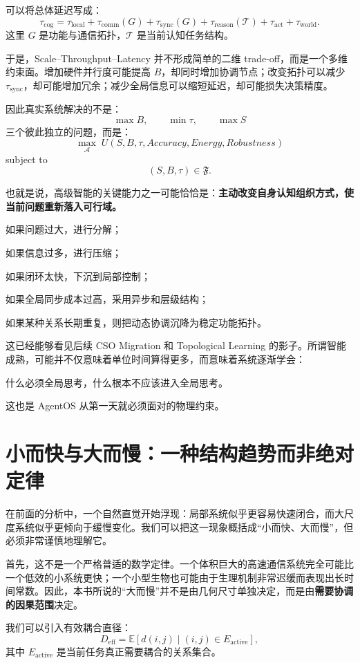 可以将总体延迟写成：
\[
\tau_{\mathrm{cog}}
=
\tau_{\mathrm{local}}
+
\tau_{\mathrm{comm}}(G)
+
\tau_{\mathrm{sync}}(G)
+
\tau_{\mathrm{reason}}(\mathcal T)
+
\tau_{\mathrm{act}}
+
\tau_{\mathrm{world}}.
\]
这里 $G$ 是功能与通信拓扑，$\mathcal T$ 是当前认知任务结构。

于是，Scale--Throughput--Latency 并不形成简单的二维 trade-off，而是一个多维约束面。增加硬件并行度可能提高 $B$，却同时增加协调节点；改变拓扑可以减少 $\tau_{\mathrm{sync}}$，却可能增加冗余；减少全局信息可以缩短延迟，却可能损失决策精度。

因此真实系统解决的不是：
\[
\max B,
\qquad
\min \tau,
\qquad
\max S
\]
三个彼此独立的问题，而是：
\[
\boxed{
\max_{\mathcal A}
\;
U(
S,
B,
\tau,
Accuracy,
Energy,
Robustness
)
}
\]
subject to
\[
(S,B,\tau)\in\mathfrak F.
\]

也就是说，高级智能的关键能力之一可能恰恰是：\textbf{主动改变自身认知组织方式，使当前问题重新落入可行域。}

如果问题过大，进行分解；

如果信息过多，进行压缩；

如果闭环太快，下沉到局部控制；

如果全局同步成本过高，采用异步和层级结构；

如果某种关系长期重复，则把动态协调沉降为稳定功能拓扑。

这已经能够看见后续 CSO Migration 和 Topological Learning 的影子。所谓智能成熟，可能并不仅意味着单位时间算得更多，而意味着系统逐渐学会：

\begin{statementbox}
什么必须全局思考，什么根本不应该进入全局思考。
\end{statementbox}

这也是 AgentOS 从第一天就必须面对的物理约束。

\section{小而快与大而慢：一种结构趋势而非绝对定律}

在前面的分析中，一个自然直觉开始浮现：局部系统似乎更容易快速闭合，而大尺度系统似乎更倾向于缓慢变化。我们可以把这一现象概括成“小而快、大而慢”，但必须非常谨慎地理解它。

首先，这不是一个严格普适的数学定律。一个体积巨大的高速通信系统完全可能比一个低效的小系统更快；一个小型生物也可能由于生理机制非常迟缓而表现出长时间常数。因此，本书所说的“大而慢”并不是由几何尺寸单独决定，而是由\textbf{需要协调的因果范围}决定。

我们可以引入有效耦合直径：
\[
D_{\mathrm{eff}}
=
\mathbb E[
d(i,j)
\mid
(i,j)\in E_{\mathrm{active}}
],
\]
其中 $E_{\mathrm{active}}$ 是当前任务真正需要耦合的关系集合。

